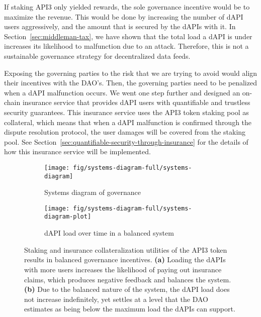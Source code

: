 \documentclass[11pt]{article}
\begin{document}
If staking API3 only yielded rewards, the sole governance incentive would be to maximize the revenue.
This would be done by increasing the number of dAPI users aggressively, and the amount that is secured by the dAPIs with it.
In Section~\ref{sec:middleman-tax}, we have shown that the total load a dAPI is under increases its likelihood to malfunction due to an attack.
Therefore, this is not a sustainable governance strategy for decentralized data feeds.

Exposing the governing parties to the risk that we are trying to avoid would align their incentives with the DAO’s.
Then, the governing parties need to be penalized when a dAPI malfunction occurs.
We went one step further and designed an on-chain insurance service that provides dAPI users with quantifiable and trustless security guarantees.
This insurance service uses the API3 token staking pool as collateral, which means that when a dAPI malfunction is confirmed through the dispute resolution protocol, the user damages will be covered from the staking pool.
See Section~\ref{sec:quantifiable-security-through-insurance} for the details of how this insurance service will be implemented.

\begin{figure}
     \centering
     \begin{subfigure}{0.49\textwidth}
         \texttt{[image: fig/systems-diagram-full/systems-diagram]}
         \caption{Systems diagram of governance}
         \label{fig:systems-diagram}
     \end{subfigure}
     \begin{subfigure}{0.49\textwidth}
         \texttt{[image: fig/systems-diagram-full/systems-diagram-plot]}
         \caption{dAPI load over time in a balanced system}
         \label{fig:systems-diagram-plot}
     \end{subfigure}
    \caption{Staking and insurance collateralization utilities of the API3 token results in balanced governance incentives.
    \textbf{(a)} Loading the dAPIs with more users increases the likelihood of paying out insurance claims, which produces negative feedback and balances the system.
   \textbf{(b)} Due to the balanced nature of the system, the dAPI load does not increase indefinitely, yet settles at a level that the DAO estimates as being below the maximum load the dAPIs can support.}
    \label{fig:systems-diagram-full}
\end{figure}
\end{document}
